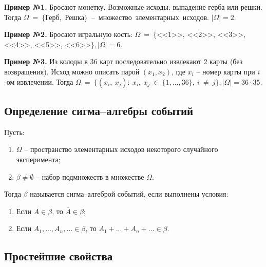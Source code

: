 \textbf{Пример №1.} Бросают монетку. Возможные исходы: выпадение герба или решки. Тогда $\Omega~=~\{$Герб,~Решка$\}$~--~множество~элементарных~исходов. $|\Omega| = 2$.

\textbf{Пример №2.} Бросают игральную кость: $\Omega~=~\{$<<1>>, <<2>>, <<3>>, <<4>>, <<5>>, <<6>>$\}, |\Omega| = 6.$

\textbf{Пример №3.} Из колоды в 36 карт последовательно извлекают 2 карты (без возвращения). Исход можно описать парой $(x_1, x_2)$, где $x_i$ -- номер карты при $i$-ом извлечении. Тогда $\Omega~=~\{(x_i,~x_j):~x_i,~x_j~\in~\{1, ..., 36\},~i~\neq~j\}, |\Omega| = 36 \cdot 35.$ 

\subsection*{Определение сигма--алгебры событий}

Пусть:
\begin{enumerate}[label=\arabic*)]
	\item $\Omega$ -- пространство элементарных исходов некоторого случайного эксперимента;
	\item $\beta \neq \emptyset$ -- набор подмножеств в множестве $\Omega$.
\end{enumerate}

Тогда $\beta$ называется сигма--алгеброй событий, если выполнены условия:

\begin{enumerate}[label=\arabic*)]
	\item Если $A \in \beta$, то $\overline{A} \in \beta$;
	\item Если $A_1, ..., A_n, ... \in \beta$, то $A_1 + ... + A_n + ... \in \beta$.
\end{enumerate}

\subsection*{Простейшие свойства}

